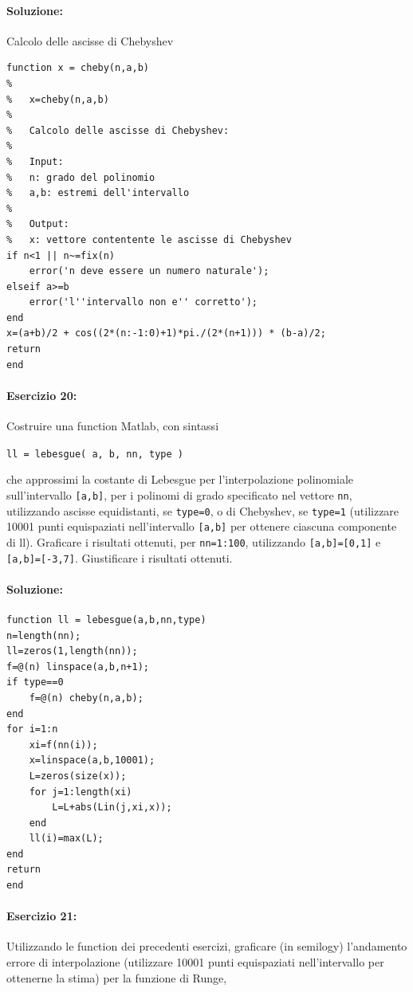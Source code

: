 \documentclass[12pt]{article}
\begin{document}
\paragraph{Soluzione:} Calcolo delle ascisse di Chebyshev 
\begin{lstlisting}[frame=single]
function x = cheby(n,a,b)
%
%   x=cheby(n,a,b)
%
%   Calcolo delle ascisse di Chebyshev:
%
%   Input:
%   n: grado del polinomio
%   a,b: estremi dell'intervallo
%
%   Output:
%   x: vettore contentente le ascisse di Chebyshev
if n<1 || n~=fix(n)
    error('n deve essere un numero naturale');
elseif a>=b
    error('l''intervallo non e'' corretto');
end
x=(a+b)/2 + cos((2*(n:-1:0)+1)*pi./(2*(n+1))) * (b-a)/2;
return
end
\end{lstlisting}
\paragraph{Esercizio 20:}
Costruire una function Matlab, con sintassi
\begin{center}
    \texttt{ll = lebesgue( a, b, nn, type )}
\end{center}
che approssimi la costante di Lebesgue per l'interpolazione polinomiale sull'intervallo \texttt{[a,b]}, per
i polinomi di grado specificato nel vettore \texttt{nn}, utilizzando ascisse equidistanti, se \texttt{type=0}, o di
Chebyshev, se \texttt{type=1} (utilizzare 10001 punti equispaziati nell'intervallo \texttt{[a,b]} per ottenere ciascuna componente di ll). 
Graficare i risultati ottenuti, per \texttt{nn=1:100}, utilizzando \texttt{[a,b]=[0,1]} e \texttt{[a,b]=[-3,7]}. Giustificare i risultati ottenuti.

\paragraph{Soluzione:}

\begin{lstlisting}[frame=single]
function ll = lebesgue(a,b,nn,type)
n=length(nn);
ll=zeros(1,length(nn));
f=@(n) linspace(a,b,n+1);
if type==0
    f=@(n) cheby(n,a,b);
end
for i=1:n
    xi=f(nn(i));
    x=linspace(a,b,10001);
    L=zeros(size(x));
    for j=1:length(xi)
        L=L+abs(Lin(j,xi,x));
    end
    ll(i)=max(L);
end
return
end
\end{lstlisting}

\paragraph{Esercizio 21:}
Utilizzando le function dei precedenti esercizi, graficare (in semilogy) l'andamento
errore di interpolazione (utilizzare 10001 punti equispaziati nell'intervallo per ottenerne la stima)
per la funzione di Runge,
\end{document}
